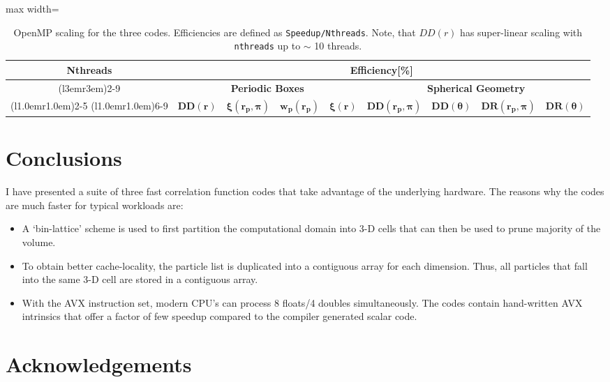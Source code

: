\documentclass[preprint, 12pt, authoryear]{elsarticle}
\newcommand{\xir}{\ensuremath{{DD(r)}}\xspace}
\newcommand{\xiofr}{\ensuremath{{\xi(r)}}\xspace}
\newcommand{\wprp}{\ensuremath{{w_p(r_p)}}\xspace}
\newcommand{\xirppi}{\ensuremath{{\xi(r_p,\pi)}}\xspace}
\begin{document}
\begin{table}
\centering
\caption{\footnotesize OpenMP scaling for the three codes. Efficiencies are defined 
as \texttt{Speedup/Nthreads}. Note, that \xir has super-linear scaling with \texttt{nthreads}
up to $\sim$ 10 threads.}
\begin{adjustbox}{max width=\textwidth}
\begin{tabular}{ccccccccc} 
\toprule
\multirow{3}{*}{\textbf{Nthreads}}   &
\multicolumn{8}{c}{\textbf{Efficiency[\%]}} \\
\cmidrule(l{3em}r{3em}){2-9}

                                     &
\multicolumn{4}{c}{\textbf{Periodic Boxes}}  &
\multicolumn{4}{c}{\textbf{Spherical Geometry}}  \\
\cmidrule(l{1.0em}r{1.0em}){2-5}
\cmidrule(l{1.0em}r{1.0em}){6-9}
                                               &
\multicolumn{1}{c}{$\boldsymbol{\xir}$}        &
\multicolumn{1}{c}{$\boldsymbol{\xirppi}$}     &
\multicolumn{1}{c}{$\boldsymbol{\wprp}$}       & 
\multicolumn{1}{c}{$\boldsymbol{\xiofr}$}      &
\multicolumn{1}{c}{$\boldsymbol{DD(r_p,\pi)}$} &
\multicolumn{1}{c}{$\boldsymbol{DD(\theta)}$}  &
\multicolumn{1}{c}{$\boldsymbol{DR(r_p,\pi)}$} & 
\multicolumn{1}{c}{$\boldsymbol{DR(\theta)}$}   \\
\midrule

\bottomrule
\end{tabular}
\end{adjustbox}
\label{table:openmp}
\end{table}


\section{Conclusions}
I have presented a suite of three fast correlation function codes that take advantage of the underlying hardware. The reasons why the codes 
are much faster for typical workloads are:
\begin{itemize}
\item A `bin-lattice' scheme is used to first partition the computational domain into 3-D cells that can then be used to prune majority of the volume. 
\item To obtain better cache-locality, the particle list is duplicated into a contiguous array for each dimension. Thus, all particles that fall into the
same 3-D cell are stored in a contiguous array. 
\item With the AVX instruction set, modern CPU's can process 8 floats/4 doubles simultaneously. The codes contain hand-written AVX intrinsics that offer a 
factor of few speedup compared to the compiler generated scalar code. 
\end{itemize}

\citet{foreman-mackey_etal_13}

\section*{Acknowledgements}



\end{document}
